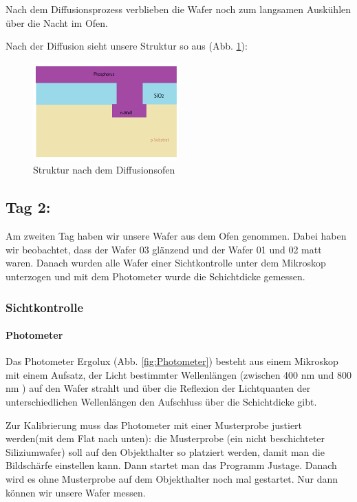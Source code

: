 Nach dem Diffusionsprozess verblieben die Wafer noch zum langsamen Auskühlen über die Nacht im Ofen.

Nach der Diffusion sieht unsere Struktur so aus (Abb. \ref{fig:StrukturnachDiffusionsofen}):

\begin{figure}[H]
    \centering
        \includegraphics[width=0.5\textwidth]{bilder/StrukturnachDiffusionsofen.png}
    \caption{Struktur nach dem Diffusionsofen}
    \label{fig:StrukturnachDiffusionsofen}
\end{figure}


\subsection[Tag 2:]{Tag 2:}


Am zweiten Tag haben wir unsere Wafer aus dem Ofen genommen. Dabei haben wir beobachtet, dass der Wafer 03 glänzend und der Wafer 01 und 02 matt waren. Danach wurden alle Wafer einer Sichtkontrolle unter dem Mikroskop unterzogen und  mit dem Photometer wurde die Schichtdicke gemessen.


\subsubsection[Sichtkontrolle]{Sichtkontrolle}

\paragraph[Photometer]{Photometer}

Das Photometer Ergolux (Abb. \ref{fig:Photometer}) besteht aus einem Mikroskop mit einem
Aufsatz, der Licht bestimmter Wellenlängen (zwischen 400 nm und 800 nm ) auf den Wafer strahlt und über die Reflexion der Lichtquanten der unterschiedlichen Wellenlängen den Aufschluss über die Schichtdicke gibt.

Zur Kalibrierung muss das Photometer mit einer Musterprobe justiert werden(mit dem Flat nach unten):  die Musterprobe (ein nicht beschichteter Siliziumwafer) soll auf den Objekthalter so platziert werden, damit man die Bildschärfe einstellen kann. Dann startet man das Programm  Justage. Danach wird es ohne Musterprobe auf dem Objekthalter noch mal gestartet.
Nur dann  können wir unsere Wafer messen.

